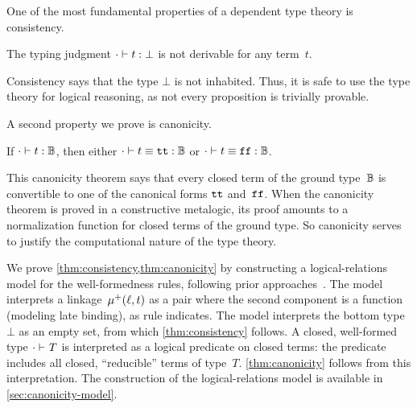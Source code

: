 One of the most fundamental properties of a dependent type theory is consistency.
\begin{theorem}[Consistency]
\label{thm:consistency}
  The typing judgment $ {\cdot} \vdash {t} : {\bot} $ is not derivable for any term~$t$.
\end{theorem}

\noindent
Consistency says that the type $\bot$ is not inhabited.
Thus, it is safe to use the type theory for logical reasoning, as not
every proposition is trivially provable.

A second property we prove is canonicity.

\begin{theorem}[Canonicity]
\label{thm:canonicity}
  If $ {\cdot} \vdash {t} : {\mathbb{B}} $, then either $ {\cdot} \vdash {t \equiv \ensuremath{\texttt{tt}}} : {\mathbb{B}} $ or $ {\cdot} \vdash {t \equiv \ensuremath{\texttt{ff}}} : {\mathbb{B}} $.
\end{theorem}

\noindent
This canonicity theorem says that every closed term of the ground
type~$\mathbb{B}$ is convertible to one of the canonical forms $\texttt{tt}$ and~$\texttt{ff}$.
When the canonicity theorem is proved in a constructive meta\-logic, its proof
amounts to a normalization function for closed terms of the ground type.
So canonicity serves to justify the computational nature of the type theory.

We prove \cref{thm:consistency,thm:canonicity} by constructing a logical-relations model
for the well-formedness rules, following prior approaches~\cite{coquand2018canonicity,kaposi2019gluing,sterling2019algebraic}.
%
The model interprets a linkage~$\mu^+({\ell},{t})$ as a pair where the
second component is a function (modeling late binding),
as rule  indicates.
%
The model interprets the bottom type~$\bot$ as an empty set, from which
\cref{thm:consistency} follows.
A closed, well-formed type $ {\cdot} \vdash_{} {T} $ is interpreted as
a logical predicate on closed terms: the predicate includes all
closed, ``reducible'' terms of type~$T$.
\cref{thm:canonicity} follows from this interpretation.
The construction of the logical-relations model is available in
\ifreport
\cref{sec:canonicity-model}.
\else

\fi